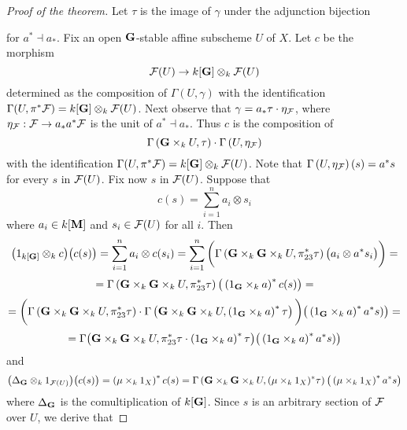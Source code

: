 \begin{proof}[Proof of the theorem]
Let $\tau$ is the image of $\gamma$ under the adjunction bijection
\begin{center}
\end{center}
for $a^*\dashv a_*$. Fix an open $\mathbf{G}$-stable affine subscheme $U$ of $X$. Let $c$ be the morphism
$${\mathcal F}(U)\rightarrow k[\mathbf{G}]\otimes_k{\mathcal F}(U)$$
determined as the composition of $\Gamma\left(U,\gamma\right)$ with the identification $\Gamma(U,\pi^*{\mathcal F}) = k[\mathbf{G}]\otimes_k{\mathcal F}(U)$. Next observe that $\gamma = a_*\tau \cdot \eta_{{\mathcal F}}$, where $\eta_{{\mathcal F}}:{\mathcal F}\rightarrow a_*a^*{\mathcal F}$ is the unit of $a^*\dashv a_*$. Thus $c$ is the composition of $$\Gamma\left(\mathbf{G}\times_kU, \tau \right)\cdot \Gamma\left(U,\eta_{{\mathcal F}}\right)$$
with the identification $\Gamma(U,\pi^*{\mathcal F}) = k[\mathbf{G}]\otimes_k{\mathcal F}(U)$. Note that $\Gamma\left(U,\eta_{{\mathcal F}}\right)(s) = a^*s$ for every $s$ in ${\mathcal F}(U)$. Fix now $s$ in ${\mathcal F}(U)$. Suppose that
$$c(s) = \sum_{i=1}^na_i\otimes s_i$$
where $a_i \in k[\mathbf{M}]$ and $s_i \in {\mathcal F}(U)$ for all $i$. Then
$$\big(1_{k[\mathbf{G}]}\otimes_k c\big)\big(c(s)\big) = \sum_{i=1}^na_i\otimes c(s_i) =  \sum_{i=1}^n\bigg( \Gamma\left(\mathbf{G}\times_k \mathbf{G} \times_kU, \pi_{23}^*\tau \right)\big(a_i \otimes a^*s_i\big) \bigg) =$$
$$= \Gamma\left(\mathbf{G}\times_k \mathbf{G} \times_k U, \pi_{23}^*\tau \right)\big(\left(1_{\mathbf{G}}\times_k a\right)^*c(s)\big) =$$
$$= \bigg(\Gamma\left(\mathbf{G}\times_k \mathbf{G} \times_kU, \pi_{23}^*\tau \right) \cdot \Gamma\left(\mathbf{G} \times_k \mathbf{G} \times_k U, \left(1_{\mathbf{G}}\times_k a\right)^*\tau \right)\bigg) \big(\left(1_{\mathbf{G}}\times_k a\right)^*a^*s)\big) = $$
$$= \Gamma\big(\mathbf{G}\times_k \mathbf{G} \times_kU, \pi_{23}^*\tau\cdot \left(1_{\mathbf{G}}\times_k a\right)^*\tau \big) \big(\left(1_{\mathbf{G}}\times_k a\right)^*a^*s)\big)$$
and
$$\big(\Delta_{\mathbf{G}}\otimes_k 1_{{\mathcal F}(U)}\big)\big(c(s)\big) =\left(\mu\times_k 1_X\right)^*c(s)=\Gamma\left(\mathbf{G}\times_k\mathbf{G}\times_kU, (\mu\times_k 1_X)^*\tau \right)\big(\left(\mu\times_k 1_X\right)^*a^*s\big)$$
where $\Delta_{\mathbf{G}}$ is the comultiplication of $k[\mathbf{G}]$. Since $s$ is an arbitrary section of ${\mathcal F}$ over $U$, we derive that

\end{proof}
